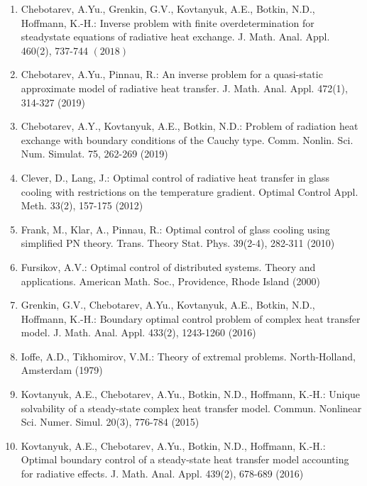 \documentclass[10pt]{article}
\begin{document}
\begin{enumerate}
  \item Chebotarev, A.Yu., Grenkin, G.V., Kovtanyuk, A.E., Botkin, N.D., Hoffmann, K.-H.: Inverse problem with finite overdetermination for steadystate equations of radiative heat exchange. J. Math. Anal. Appl. 460(2), 737-744 $(2018)$

  \item Chebotarev, A.Yu., Pinnau, R.: An inverse problem for a quasi-static approximate model of radiative heat transfer. J. Math. Anal. Appl. 472(1), 314-327 (2019)

  \item Chebotarev, A.Y., Kovtanyuk, A.E., Botkin, N.D.: Problem of radiation heat exchange with boundary conditions of the Cauchy type. Comm. Nonlin. Sci. Num. Simulat. 75, 262-269 (2019)

  \item Clever, D., Lang, J.: Optimal control of radiative heat transfer in glass cooling with restrictions on the temperature gradient. Optimal Control Appl. Meth. 33(2), 157-175 (2012)

  \item Frank, M., Klar, A., Pinnau, R.: Optimal control of glass cooling using simplified PN theory. Trans. Theory Stat. Phys. 39(2-4), 282-311 (2010)

  \item Fursikov, A.V.: Optimal control of distributed systems. Theory and applications. American Math. Soc., Providence, Rhode Island (2000)

  \item Grenkin, G.V., Chebotarev, A.Yu., Kovtanyuk, A.E., Botkin, N.D., Hoffmann, K.-H.: Boundary optimal control problem of complex heat transfer model. J. Math. Anal. Appl. 433(2), 1243-1260 (2016)

  \item Ioffe, A.D., Tikhomirov, V.M.: Theory of extremal problems. North-Holland, Amsterdam (1979)

  \item Kovtanyuk, A.E., Chebotarev, A.Yu., Botkin, N.D., Hoffmann, K.-H.: Unique solvability of a steady-state complex heat transfer model. Commun. Nonlinear Sci. Numer. Simul. 20(3), 776-784 (2015)

  \item Kovtanyuk, A.E., Chebotarev, A.Yu., Botkin, N.D., Hoffmann, K.-H.: Optimal boundary control of a steady-state heat transfer model accounting for radiative effects. J. Math. Anal. Appl. 439(2), 678-689 (2016)


\end{enumerate}
\end{document}
